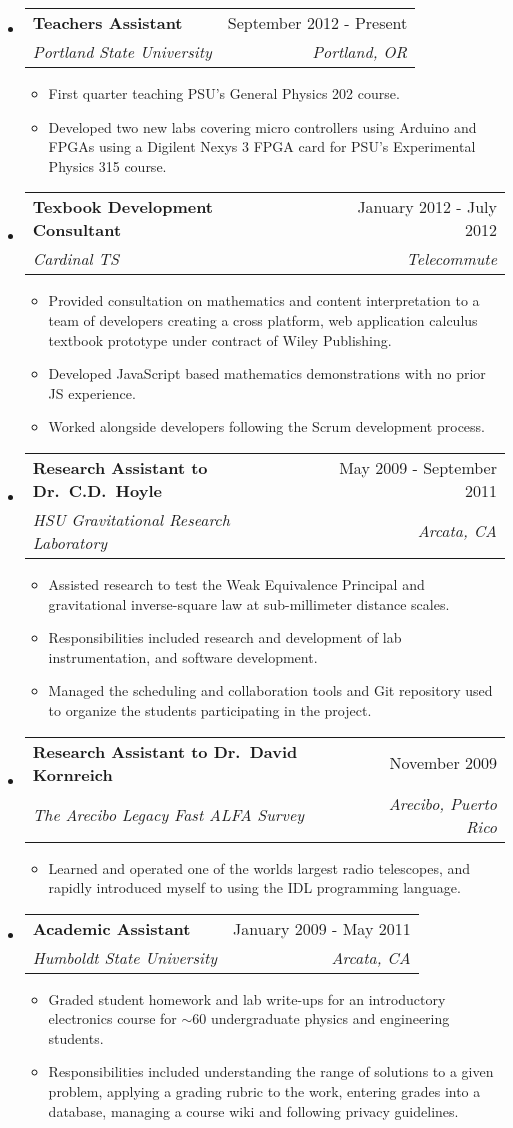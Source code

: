 \documentclass[letterpaper,11pt]{article}
\makeatletter
\newcommand{\resitem}[1]{\item #1 \vspace{-2pt}}
\newcommand{\ressubheading}[4]{
\begin{tabular*}{7.0in}{l@{\extracolsep{\fill}}r}
		\textbf{#1} & #2 \\
		\textit{#3} & \textit{#4} \\
\end{tabular*}\vspace{-6pt}}
\makeatother
\begin{document}
\begin{itemize}
\item
\ressubheading
{Teachers Assistant}
{September 2012 - Present}
{Portland State University}
{Portland, OR}
\begin{itemize}
	\resitem
    {First quarter teaching PSU's General Physics 202 course.}
	\resitem
    {Developed two new labs covering micro controllers using Arduino and FPGAs using a Digilent Nexys 3 FPGA card for PSU's Experimental Physics 315 course.}
\end{itemize}

\item
\ressubheading{Texbook Development Consultant}{January 2012 - July 2012}{Cardinal TS}{Telecommute}
\begin{itemize}
    \resitem
    {Provided consultation on mathematics and content interpretation to a team of developers creating a cross platform, web application calculus textbook prototype under contract of Wiley Publishing.}
	\resitem
    {Developed JavaScript based mathematics demonstrations with no prior JS experience.}
    \resitem
    {Worked alongside developers following the Scrum development process.}
\end{itemize}

\item
\ressubheading
{Research Assistant to Dr.\ C\@.D.\ Hoyle}
{May 2009 - September 2011}
{HSU Gravitational Research Laboratory}
{Arcata, CA}
\begin{itemize}
    \resitem
    {Assisted research to test the Weak Equivalence Principal and gravitational inverse-square law at sub-millimeter distance scales.}
    \resitem
    {Responsibilities included research and development of lab instrumentation, and software development.}
    \resitem
    {Managed the scheduling and collaboration tools and Git repository used to organize the students participating in the project.}
\end{itemize}

\item
\ressubheading
{Research Assistant to Dr.\ David Kornreich}
{November 2009}
{The Arecibo Legacy Fast ALFA Survey}
{Arecibo, Puerto Rico}
\begin{itemize}
    \resitem
    {Learned and operated one of the worlds largest radio telescopes, and rapidly introduced myself to using the IDL programming language.}
\end{itemize}

\item
\ressubheading
{Academic Assistant}
{January 2009 - May 2011}
{Humboldt State University}
{Arcata, CA}
\begin{itemize}
    \resitem{Graded student homework and lab write-ups for an introductory electronics course for $\sim$60 undergraduate physics and engineering students.}
    \resitem{Responsibilities included understanding the range of solutions to a given problem, applying a grading rubric to the work, entering grades into a database, managing a course wiki and following privacy guidelines.}
\end{itemize}

\end{itemize}
\end{document}
